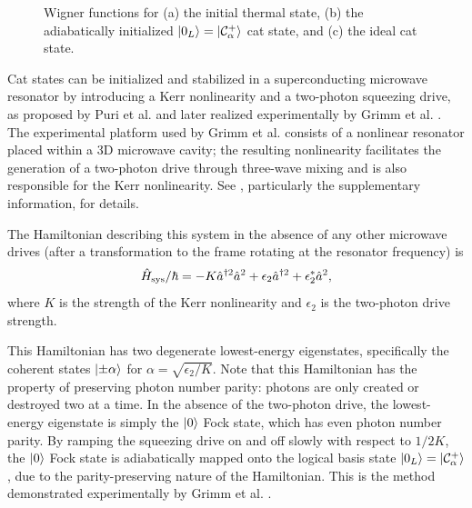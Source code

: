 \begin{figure}[t]
\begin{subfigure}[b]{0.30\textwidth}
         \caption{}
         \label{fig:ideal_cat}
     \end{subfigure}
        \caption{Wigner functions for (a) the initial thermal state, (b) the adiabatically initialized $\ket{0_L} = \ket{\mathcal{C}_\alpha^+}$ cat state, and (c) the ideal cat state.}
        \label{fig:initialization_wigner}
\end{figure}

Cat states can be initialized and stabilized in a superconducting microwave resonator by introducing a Kerr nonlinearity and a two-photon squeezing drive, as proposed by Puri et al. and later realized experimentally by Grimm et al. \cite{puri_2017,grimm_2020}.
The experimental platform used by Grimm et al. consists of a nonlinear resonator placed within a 3D microwave cavity; the resulting nonlinearity facilitates the generation of a two-photon drive through three-wave mixing and is also responsible for the Kerr nonlinearity.
See \cite{grimm_2020}, particularly the supplementary information, for details.

The Hamiltonian describing this system in the absence of any other microwave drives (after a transformation to the frame rotating at the resonator frequency) is
\begin{equation}
    \hat{H}_{\rm sys} / \hbar = -K \hat{a}^{\dag 2} \hat{a}^2 + \epsilon_2 \hat{a}^{\dag 2} + \epsilon_2^* \hat{a}^2,
\end{equation}
where $K$ is the strength of the Kerr nonlinearity and $\epsilon_2$ is the two-photon drive strength.

This Hamiltonian has two degenerate lowest-energy eigenstates, specifically the coherent states $\ket{\pm \alpha}$ for $\alpha = \sqrt{\epsilon_2 / K}$.
Note that this Hamiltonian has the property of preserving photon number parity: photons are only created or destroyed two at a time.
In the absence of the two-photon drive, the lowest-energy eigenstate is simply the $\ket{0}$ Fock state, which has even photon number parity.
By ramping the squeezing drive on and off slowly with respect to $1/2K$, the $\ket{0}$ Fock state is adiabatically mapped onto the logical basis state $\ket{0_L} = \ket{\mathcal{C}_\alpha^+}$, due to the parity-preserving nature of the Hamiltonian.
This is the method demonstrated experimentally by Grimm et al. \cite{grimm_2020}.

